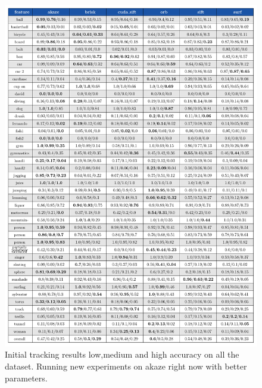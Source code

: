 \begin{figure}[t]
\centerline{%
		\includegraphics[width=0.98\linewidth]{tables/tracking_precision.pdf}}
    \vspace{-2mm} 
	\caption{Initial tracking results low,medium and high accuracy on all the dataset. Running new experiments on akaze right now with better parameters.}
	\label{fig:false_positives}
\end{figure}